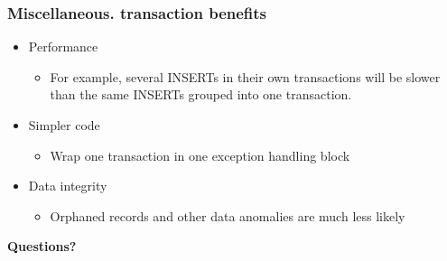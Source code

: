 \documentclass[svgnames]{beamer}
\begin{document}
\begin{frame}
    \frametitle{Miscellaneous. transaction benefits}
    \begin{itemize}
        \item Performance
        \begin{itemize}
            \item For example, several INSERTs in their own transactions will
            be slower than the same INSERTs grouped into one transaction.
        \end{itemize}
        \item Simpler code
        \begin{itemize}
            \item Wrap one transaction in one exception handling block
        \end{itemize}
        \item Data integrity
        \begin{itemize}
            \item Orphaned records and other data anomalies are much less likely
        \end{itemize}
    \end{itemize}
\end{frame}

\begin{frame}
    \begin{centering}
        \textbf{Questions?} \par
    \end{centering}
\end{frame}


\end{document}
